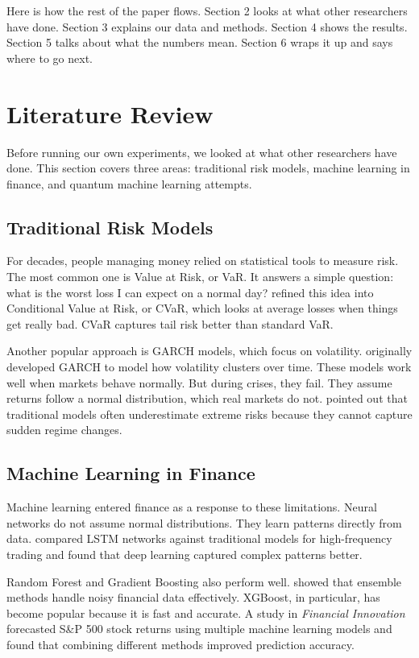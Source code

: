 \documentclass[12pt,a4paper]{article}
\begin{document}
Here is how the rest of the paper flows. Section 2 looks at what other researchers have done. Section 3 explains our data and methods. Section 4 shows the results. Section 5 talks about what the numbers mean. Section 6 wraps it up and says where to go next.

\section{Literature Review}
Before running our own experiments, we looked at what other researchers have done. This section covers three areas: traditional risk models, machine learning in finance, and quantum machine learning attempts.

\subsection{Traditional Risk Models}
For decades, people managing money relied on statistical tools to measure risk. The most common one is Value at Risk, or VaR. It answers a simple question: what is the worst loss I can expect on a normal day? \citet{rockafellar2022} refined this idea into Conditional Value at Risk, or CVaR, which looks at average losses when things get really bad. CVaR captures tail risk better than standard VaR.

Another popular approach is GARCH models, which focus on volatility. \citet{bollerslev1986} originally developed GARCH to model how volatility clusters over time. These models work well when markets behave normally. But during crises, they fail. They assume returns follow a normal distribution, which real markets do not. \citet{orus2023} pointed out that traditional models often underestimate extreme risks because they cannot capture sudden regime changes.

\subsection{Machine Learning in Finance}
Machine learning entered finance as a response to these limitations. Neural networks do not assume normal distributions. They learn patterns directly from data. \citet{borovkova2022} compared LSTM networks against traditional models for high-frequency trading and found that deep learning captured complex patterns better.

Random Forest and Gradient Boosting also perform well. \citet{jiang2023} showed that ensemble methods handle noisy financial data effectively. XGBoost, in particular, has become popular because it is fast and accurate. A study in \textit{Financial Innovation} \citep{financial2024} forecasted S\&P 500 stock returns using multiple machine learning models and found that combining different methods improved prediction accuracy.
\end{document}

